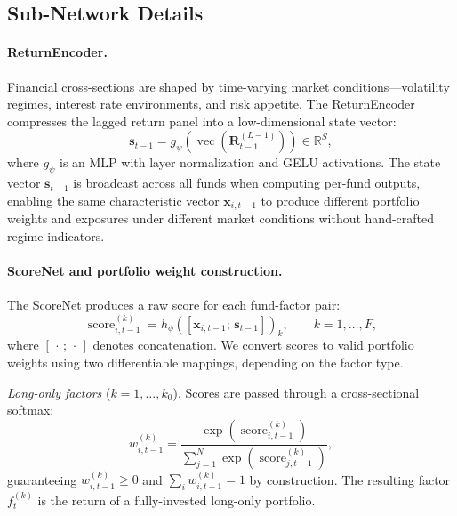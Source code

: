 \subsection{Sub-Network Details}\label{sec:subnetworks}

\paragraph{ReturnEncoder.} Financial cross-sections are shaped by time-varying market conditions---volatility regimes, interest rate environments, and risk appetite. The ReturnEncoder compresses the lagged return panel into a low-dimensional state vector:
\begin{equation}\label{eq:return-encoder}
    \mathbf{s}_{t-1} = g_\psi\!\left(\operatorname{vec}\!\left(\mathbf{R}_{t-1}^{(L-1)}\right)\right) \in \mathbb{R}^{S},
\end{equation}
where $g_\psi$ is an MLP with layer normalization and GELU activations. The state vector $\mathbf{s}_{t-1}$ is broadcast across all funds when computing per-fund outputs, enabling the same characteristic vector $\mathbf{x}_{i,t-1}$ to produce different portfolio weights and exposures under different market conditions without hand-crafted regime indicators.

\paragraph{ScoreNet and portfolio weight construction.} The ScoreNet produces a raw score for each fund-factor pair:
\begin{equation}\label{eq:scorenet}
    \operatorname{score}_{i,t-1}^{(k)} = h_\phi\!\left([\mathbf{x}_{i,t-1};\, \mathbf{s}_{t-1}]\right)_k, \qquad k = 1, \ldots, F,
\end{equation}
where $[\,\cdot\,;\,\cdot\,]$ denotes concatenation. We convert scores to valid portfolio weights using two differentiable mappings, depending on the factor type.

\emph{Long-only factors} ($k = 1, \ldots, k_0$). Scores are passed through a cross-sectional softmax:
\begin{equation}\label{eq:long-only}
    w_{i,t-1}^{(k)} = \frac{\exp\!\left(\operatorname{score}_{i,t-1}^{(k)}\right)}{\sum_{j=1}^{N} \exp\!\left(\operatorname{score}_{j,t-1}^{(k)}\right)},
\end{equation}
guaranteeing $w_{i,t-1}^{(k)} \geq 0$ and $\sum_{i} w_{i,t-1}^{(k)} = 1$ by construction. The resulting factor $f_t^{(k)}$ is the return of a fully-invested long-only portfolio.

